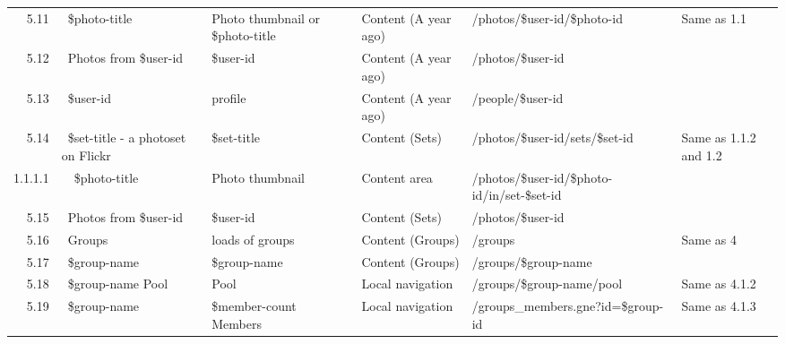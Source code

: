 \documentclass[12pt,a4paper]{article}
\begin{document}
\begin{landscape}
\begin{table}[h!b!p!]
\begin{center}
\begin{tiny}
\begin{tabular}{r|l|l|l|l|p{3cm}}
              5.11 &
              ~\$photo-title &
              Photo thumbnail or \$photo-title &
              Content (A year ago) &
              /photos/\$user-id/\$photo-id &
              Same as 1.1 \\

              5.12 &
              ~Photos from \$user-id &
              \$user-id &
              Content (A year ago) &
              /photos/\$user-id &
              \\

              5.13 &
              ~\$user-id &
              profile &
              Content (A year ago) &
              /people/\$user-id &
              \\

              5.14 &
              ~\$set-title - a photoset on Flickr &
              \$set-title &
              Content (Sets) &
              /photos/\$user-id/sets/\$set-id &
              Same as 1.1.2 and 1.2 \\

                1.1.1.1 &
                ~~\$photo-title &
                Photo thumbnail &
                Content area &
                /photos/\$user-id/\$photo-id/in/set-\$set-id &
                \\

              5.15 &
              ~Photos from \$user-id &
              \$user-id &
              Content (Sets) &
              /photos/\$user-id &
              \\

              5.16 &
              ~Groups &
              loads of groups &
              Content (Groups) &
              /groups &
              Same as 4\\

              5.17 &
              ~\$group-name &
              \$group-name &
              Content (Groups) &
              /groups/\$group-name &
              \\

              5.18 &
              ~\$group-name Pool &
              Pool &
              Local navigation &
              /groups/\$group-name/pool &
              Same as 4.1.2 \\

              5.19 &
              ~\$group-name  &
              \$member-count Members &
              Local navigation &
              /groups\_members.gne?id=\$group-id &
              Same as 4.1.3 \\

          \end{tabular}
        \rm
      \end{tiny}
    \end{center}
  \end{table}
\end{landscape}
\end{document}
